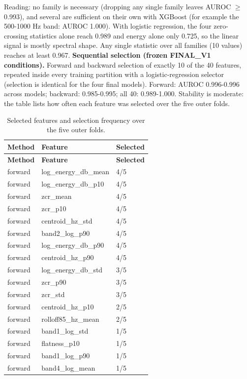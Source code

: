 \documentclass[10pt,a4paper]{article}
\begin{document}
Reading: no family is necessary (dropping any single family leaves AUROC $\geq$ 0.993), and several are sufficient on their own with XGBoost (for example the 500-1000 Hz band: AUROC 1.000). With logistic regression, the four zero-crossing statistics alone reach 0.989 and energy alone only 0.725, so the linear signal is mostly spectral shape. Any single statistic over all families (10 values) reaches at least 0.967.
\textbf{Sequential selection (frozen FINAL\_V1 conditions).} Forward and backward selection of exactly 10 of the 40 features, repeated inside every training partition with a logistic-regression selector (selection is identical for the four final models). Forward: AUROC 0.996-0.996 across models; backward: 0.985-0.995; all 40: 0.989-1.000. Stability is moderate: the table lists how often each feature was selected over the five outer folds.
\begin{center}\tiny\renewcommand{\arraystretch}{1.12}
\begin{longtable}{lll}
\caption{Selected features and selection frequency over the five outer folds.}\\
\toprule
\textbf{Method} & \textbf{Feature} & \textbf{Selected}\\\midrule\endfirsthead
\toprule
\textbf{Method} & \textbf{Feature} & \textbf{Selected}\\\midrule\endhead
\bottomrule\endfoot
forward & log\_energy\_db\_mean & 4/5\\
forward & log\_energy\_db\_p10 & 4/5\\
forward & zcr\_mean & 4/5\\
forward & zcr\_p10 & 4/5\\
forward & centroid\_hz\_std & 4/5\\
forward & band2\_log\_p90 & 4/5\\
forward & log\_energy\_db\_p90 & 4/5\\
forward & centroid\_hz\_p90 & 4/5\\
forward & log\_energy\_db\_std & 3/5\\
forward & zcr\_p90 & 3/5\\
forward & zcr\_std & 3/5\\
forward & centroid\_hz\_p10 & 2/5\\
forward & rolloff85\_hz\_mean & 2/5\\
forward & band1\_log\_std & 1/5\\
forward & flatness\_p10 & 1/5\\
forward & band1\_log\_p90 & 1/5\\
forward & band4\_log\_mean & 1/5\\

\end{longtable}
\end{center}
\end{document}
